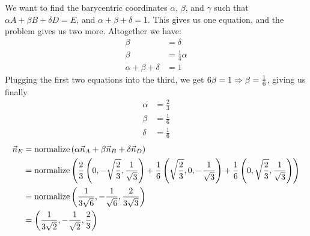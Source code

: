 \documentclass[11pt, oneside]{article}
\begin{document}
\begin{enumerate}[Q1.]
  We want to find the barycentric coordinates $\alpha$, $\beta$, and $\gamma$ such that $\alpha A + \beta B + \delta D = E$, and $\alpha + \beta + \delta = 1$. This gives us one equation, and the problem gives us two more. Altogether we have:
  \begin{align*}
    \beta &= \delta\\
    \beta &= \frac 1 4 \alpha\\
    \alpha + \beta + \delta &= 1
  \end{align*}
  Plugging the first two equations into the third, we get $6\beta = 1 \Rightarrow \beta = \frac 1 6$, giving us finally
  \begin{align*}
    \alpha &= \frac 2 3\\
    \beta &= \frac 1 6\\
    \delta &= \frac 1 6
  \end{align*}
  \begin{align*}
    \vec{n}_E &= \mathrm{normalize}\left(\alpha\vec{n}_A + \beta\vec{n}_B + \delta\vec{n}_D\right)\\
              &= \mathrm{normalize}\left(\frac 2 3\left(0, -\sqrt{\frac{2}{3}}, \frac 1 {\sqrt 3}\right) + \frac 1 6\left(\sqrt{\frac{2}{3}}, 0, -\frac 1 {\sqrt 3}\right) + \frac 1 6\left(0, \sqrt{\frac{2}{3}}, \frac 1 {\sqrt 3}\right)\right)\\
              &= \mathrm{normalize}\left(\frac 1 {3\sqrt 6},-\frac 1 {\sqrt 6}, \frac 2 {3\sqrt 3} \right)\\
              &= \left(\frac 1 {3\sqrt 2},-\frac 1 {\sqrt 2}, \frac 2 3 \right)
  \end{align*}
\end{enumerate}
\end{document}
